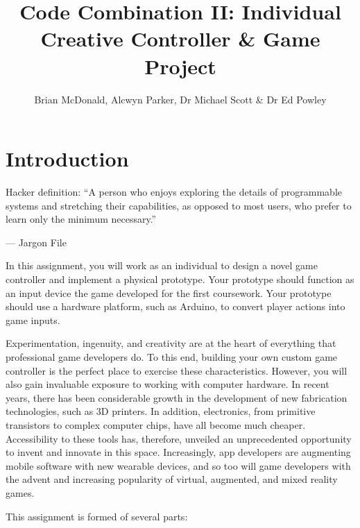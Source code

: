 \documentclass{../../fal_assignment}
\title{Code Combination II: Individual Creative Controller \& Game Project}
\author{Brian McDonald, Alcwyn Parker, Dr Michael Scott \& Dr Ed Powley}
\begin{document}
\maketitle

\section*{Introduction}

\begin{marginquote}
Hacker definition: ``A person who enjoys exploring the details of programmable systems and stretching their capabilities, as opposed to most users, who prefer to learn only the minimum necessary.''

--- Jargon File

\end{marginquote}

In this assignment, you will work as an individual to design a novel game controller and implement a physical prototype. Your prototype should function as an input device the game developed for the first coursework. Your prototype should use a hardware platform, such as Arduino, to convert player actions into game inputs. 

Experimentation, ingenuity, and creativity are at the heart of everything that professional game developers do. To this end, building your own custom game controller is the perfect place to exercise these characteristics. However, you will also gain invaluable exposure to working with computer hardware. In recent years, there has been considerable growth in the development of new fabrication technologies, such as 3D printers. In addition, electronics, from primitive transistors to complex computer chips, have all become much cheaper. Accessibility to these tools has, therefore, unveiled an unprecedented opportunity to invent and innovate in this space. Increasingly, app developers are augmenting mobile software with new wearable devices, and so too will game developers with the advent and increasing popularity of virtual, augmented, and mixed reality games.


This assignment is formed of several parts:
\end{document}
